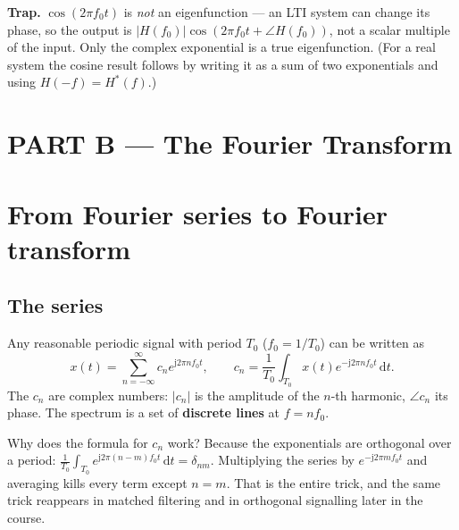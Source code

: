 \documentclass[11pt,a4paper]{article}
\newcommand{\dd}{\,\mathrm{d}}
\newcommand{\ii}{\mathrm{j}}
\begin{document}
\begin{trapbox}
\textbf{Trap.} $\cos(2\pi f_0t)$ is \emph{not} an eigenfunction --- an LTI system can change its phase, so the
output is $|H(f_0)|\cos(2\pi f_0 t+\angle H(f_0))$, not a scalar multiple of the input. Only the complex
exponential is a true eigenfunction. (For a real system the cosine result follows by writing it as a sum of
two exponentials and using $H(-f)=H^*(f)$.)
\end{trapbox}
\section*{\color{keyblue}PART B --- The Fourier Transform}

\section{From Fourier series to Fourier transform}

\subsection{The series}
Any reasonable periodic signal with period $T_0$ ($f_0=1/T_0$) can be written as
\[
x(t)=\sum_{n=-\infty}^{\infty}c_n e^{\ii2\pi n f_0 t},
\qquad
c_n=\frac{1}{T_0}\int_{T_0}x(t)e^{-\ii2\pi n f_0 t}\dd t .
\]
The $c_n$ are complex numbers: $|c_n|$ is the amplitude of the $n$-th harmonic, $\angle c_n$ its phase. The
spectrum is a set of \textbf{discrete lines} at $f=nf_0$.

Why does the formula for $c_n$ work? Because the exponentials are orthogonal over a period:
$\frac{1}{T_0}\int_{T_0}e^{\ii2\pi(n-m)f_0t}\dd t=\delta_{nm}$. Multiplying the series by $e^{-\ii2\pi mf_0t}$
and averaging kills every term except $n=m$. That is the entire trick, and the same trick reappears in matched
filtering and in orthogonal signalling later in the course.
\end{document}
